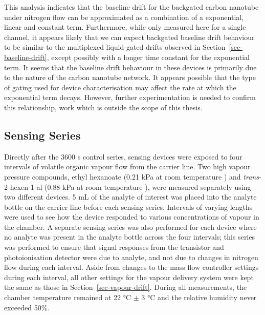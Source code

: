 \documentclass[
  a4paper,
]{scrbook}
\begin{document}
This analysis indicates that the baseline drift for the backgated carbon
nanotube under nitrogen flow can be approximated as a combination of a
exponential, linear and constant term. Furthermore, while only measured
here for a single channel, it appears likely that we can expect
backgated baseline drift behaviour to be similar to the multiplexed
liquid-gated drifts observed in Section~\ref{sec-baseline-drift}, except
possibly with a longer time constant for the exponential term. It seems
that the baseline drift behaviour in these devices is primarily due to
the nature of the carbon nanotube network. It appears possible that the
type of gating used for device characterisation may affect the rate at
which the exponential term decays. However, further experimentation is
needed to confirm this relationship, work which is outside the scope of
this thesis.

\hypertarget{sec-vapour-series}{%
\subsection{Sensing Series}\label{sec-vapour-series}}

Directly after the 3600 s control series, sensing devices were exposed
to four intervals of volatile organic vapour flow from the carrier line.
Two high vapour pressure compounds, ethyl hexanoate (0.21 kPa at room
temperature \autocite{EtHex}) and \emph{trans}-2-hexen-1-al (0.88 kPa at
room temperature \autocite{E2Hex}), were measured separately using two
different devices. 5 mL of the analyte of interest was placed into the
analyte bottle on the carrier line before each sensing series. Intervals
of varying lengths were used to see how the device responded to various
concentrations of vapour in the chamber. A separate sensing series was
also performed for each device where no analyte was present in the
analyte bottle across the four intervals; this series was performed to
ensure that signal responses from the transistor and photoionisation
detector were due to analyte, and not due to changes in nitrogen flow
during each interval. Aside from changes to the mass flow controller
settings during each interval, all other settings for the vapour
delivery system were kept the same as those in
Section~\ref{sec-vapour-drift}. During all measurements, the chamber
temperature remained at 22 °C \(\pm\) 3 °C and the relative humidity
never exceeded 50\%.
\end{document}
